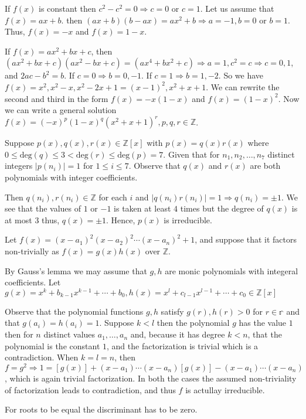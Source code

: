   If $f(x)$ is constant then $c^2 - c^2 = 0 \Rightarrow c = 0$ or $c = 1$. Let us assume that $f(x) = ax +
  b$. then $(ax + b)(b - ax) = ax^2 + b \Rightarrow a = -1, b = 0$ or $b = 1$. Thus, $f(x) = -x$ and $f(x) =
  1 - x$.

  If $f(x) = ax^2 + bx + c$, then $(ax^2 + bx + c)(ax^2 - bx + c) = (ax^4 + bx^2 + c) \Rightarrow a = 1, c^2
  = c \Rightarrow c = 0, 1$, and $2ac - b^2 = b$. If $c = 0\Rightarrow b = 0, -1$. If $c = 1\Rightarrow b =
  1, -2$. So we have $f(x) = x^2, x^2 -x, x^2 - 2x + 1 = (x - 1)^2, x^2 + x + 1$. We can rewrite the second
  and third in the form $f(x) = -x(1 - x)$ and $f(x) = (1 - x)^2$. Now we can write a general solution $f(x)
  = (-x)^p(1 - x)^q(x^2 + x + 1)^r, p, q, r\in\mathbb{Z}$.
\item Suppose $p(x), q(x), r(x)\in\mathbb{Z}[x]$ with $p(x) = q(x)r(x)$ where $0\leq\mathrm{deg}(q)\leq 3 <
  \mathrm{deg}(r)\leq\mathrm{deg}(p) = 7$. Given that for $n_1, n_2, \ldots, n_7$ distinct integers
  $|p(n_i)| = 1$ for $1\leq i\leq 7$. Observe that $q(x)$ and $r(x)$ are both polynomials with integer
  coefficients.

  Then $q(n_i), r(n_i)\in\mathbb{Z}$ for each $i$ and $|q(n_i)r(n_i)| = 1 \Rightarrow q(n_i) = \pm1$. We see
  that the values of $1$ or $-1$ is taken at least $4$ times but the degree of $q(x)$ is at most $3$ thus,
  $q(x) = \pm 1$. Hence, $p(x)$ is irreducible.
\item Let $f(x) = (x - a_1)^2(x - a_2)^2\cdots(x - a_n)^2 + 1$, and suppose that it factors non-trivially as
  $f(x) = g(x)h(x)$ over $\mathbb{Z}$.

  By Gauss's lemma we may assume that $g, h$ are monic polynomials with integeral coefficients. Let $g(x) =
  x^k + b_{k - 1}x^{k - 1} + \cdots + b_0, h(x) = x^l + c_{l - 1}x^{l - 1} + \cdots + c_0\in\mathbb{Z}[x]$

  Observe that the polynomial functions $g, h$ satisfy $g(r), h(r) > 0$ for $r\in\mathbb{r}$ and that
  $g(a_i) = h(a_i) = 1$. Suppose $k < l$ then the polynomial $g$ has the value $1$ then for $n$ distinct
  values $a_1, \ldots, a_n$ and, because it has degree $k < n$, that the polynomial is the constant $1$, and
  the factorization is trivial which is a contradiction. When $k = l = n$, then $f = g^2 \Rightarrow 1 =
  [g(x)] + (x - a_1)\cdots(x - a_n)[g(x)] - (x - a_1)\cdots(x - a_n)$, which is again trivial
  factorization. In both the cases the assumed non-triviality of factorization leads to contradiction, and
  thus $f$ is actullay irreducible.
\item For roots to be equal the discriminant has to be zero.


